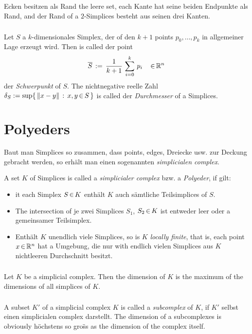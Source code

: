 \documentclass[11pt,twoside]{article}
\def\simS{S}
\def\simK{K}
\begin{document}
\begin{example}
Ecken besitzen als Rand the leere set,
each Kante hat seine beiden Endpunkte als Rand,
and der Rand of a $2$-Simplices besteht aus seinen drei Kanten.
\end{example}

\subparagraph{}
Let $\simS$ a $k$-dimensionales Simplex,
der of den $k+1$ points $p_0,\ldots,p_k$ in allgemeiner Lage erzeugt wird.
Then is called der point
\[
\overline{\simS} \, := \, \frac{1}{k+1} \, \sum_{i=0}^k\,  p_i \quad \xeof \R^n
\]
der \textit{Schwerpunkt} of $\simS$.
The nichtnegative reelle Zahl
$\delta_{\simS} := \operatorname{sup} \set{\norm{x-y}}{x,y \xeof \simS}$
is called der \textit{Durchmesser} of a Simplices.

\section{Polyeders}
Baut man Simplices so zusammen,
dass points, edges, Dreiecke usw. zur Deckung gebracht werden,
so erh\"alt man einen sogenannten \textit{simplicialen complex}.

\begin{definition}
A set $\simK$ of Simplices is called a \textit{simplicialer complex}
bzw. a \textit{Polyeder}, if gilt:

\begin{itemize}
\item
it each Simplex $\simS \xeof \simK$ enth\"alt $\simK$ auch
s\"amtliche Teilsimplices of $\simS$.
\item
The intersection of je zwei Simplices $\simS_1$, $\simS_2 \xeof \simK$
ist entweder leer oder a gemeinsamer Teilsimplex.
\item
Enth\"alt $\simK$ unendlich viele Simplices,
so is $\simK$ \textit{locally finite},
that is,
each point $x {\,\in\,} {\mathbb{R}}^n$ hat a Umgebung,
die nur with endlich vielen Simplices aus $K$ nichtleeren Durchschnitt besitzt.
\end{itemize}
\end{definition}

\subparagraph{}
Let $\simK$ be a simplicial complex.
Then the dimension of $\simK$
is the maximum of the dimensions of all simplices of $\simK$.

\subparagraph{}
A subset $\simK'$ of a simplicial complex $\simK$ is called
a \textit{subcomplex} of $\simK$,
if $\simK'$ selbst einen simplicialen complex darstellt.
The dimension of a subcomplexes is obviously h\"ochstens so gro\"ss
as the dimension of the complex itself.
\end{document}
